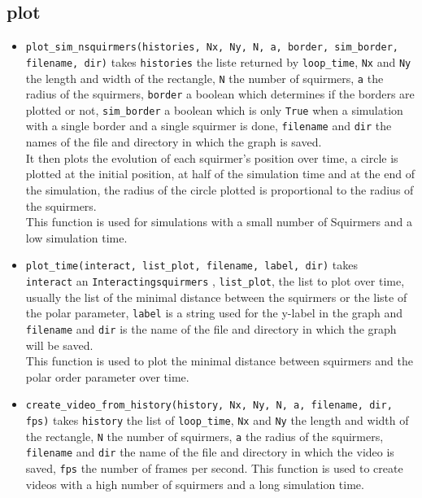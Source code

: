 \documentclass{article}
\begin{document}
\subsection*{plot}
\begin{itemize}
   \item \texttt{plot\_sim\_nsquirmers(histories, Nx, Ny, N, a, border, sim\_border, filename, dir)} takes \texttt{histories}
   the liste returned by \texttt{loop\_time}, \texttt{Nx} and 
   \texttt{Ny} the length and width of the rectangle, \texttt{N} the number of squirmers, \texttt{a} the radius of the squirmers,
   \texttt{border} a boolean which determines if the borders are plotted or not, \texttt{sim\_border} a boolean which is only \texttt{True}
    when a simulation with a single border and a single squirmer is done, \texttt{filename} and \texttt{dir} the names 
    of the file and directory in which the graph is saved.\\
   It then plots the evolution of each squirmer's position over time, a circle is plotted at the initial position, at
   half of the simulation time and at the end of the simulation,
   the radius of the circle plotted is proportional to the radius of the squirmers.\\
   This function is used for simulations with a small number of Squirmers and a low simulation time.
   \item \texttt{plot\_time(interact, list\_plot, filename, label, dir)} takes \\
   \texttt{interact} an \texttt{Interactingsquirmers}
   , \texttt{list\_plot}, the list to plot over time, usually the list of the minimal distance between the squirmers or the liste of the polar parameter,
   \texttt{label} is a string used for the y-label in the graph and \texttt{filename} and \texttt{dir} is the name of the file
    and directory in which the graph will be saved.\\
    This function is used to plot the minimal distance between squirmers and the polar order parameter over time.
   \item \texttt{create\_video\_from\_history(history, Nx, Ny, N, a, filename, dir, fps)} takes \texttt{history}
   the list of \texttt{loop\_time}, \texttt{Nx} and \texttt{Ny} the length and width of the rectangle,
   \texttt{N} the number of squirmers, \texttt{a} the radius of the squirmers, \texttt{filename} and \texttt{dir}
   the name of the file and directory in which the video is saved, \texttt{fps} the number of frames per second.
    This function is used to create videos with a high number of squirmers and a long simulation time.
\end{itemize}
\end{document}
